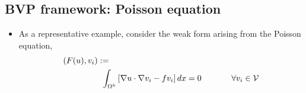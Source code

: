 \subsection*{BVP framework: Poisson equation}
\begin{frame}%
  \begin{itemize}
  \item {As a representative example, consider the weak form 
      arising from the Poisson equation,
    \begin{eqnarray}
      \nonumber
      (F( u ), v_i) := \hspace{2.5in} \\  \nonumber
      \int_{\Omega^h}  \left[ \nabla u \cdot \nabla v_i - fv_i \right] dx %
      =0 \hspace{.5in} \forall v_i \in \mathcal{V}
    \end{eqnarray}
  }
  \end{itemize}
\end{frame}
